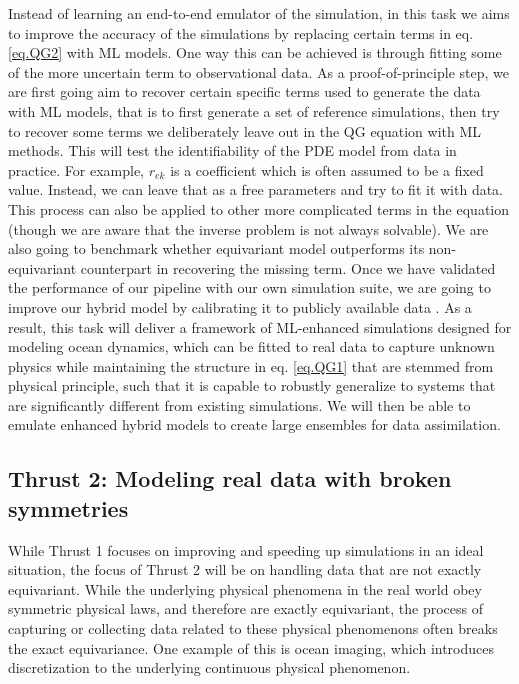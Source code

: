 \documentclass[11pt]{article}
\begin{document}
Instead of learning an end-to-end emulator of the simulation, in this task we aims to improve the accuracy of the simulations by replacing certain terms in eq. \ref{eq.QG2} with ML models. One way this can be achieved is through fitting some of the more uncertain term to observational data.
As a proof-of-principle step, we are first going aim to recover certain specific terms used to generate the data with ML models, that is to first generate a set of reference simulations, then try to recover some terms we deliberately leave out in the QG equation with ML methods. This will test the identifiability of the PDE model from data in practice. For example, $r_{ek}$ is a coefficient which is often assumed to be a fixed value. Instead, we can leave that as a free parameters and try to fit it with data. This process can also be applied to other more complicated terms in the equation (though we are aware that the inverse problem is not always solvable). We are also going to benchmark whether equivariant model outperforms its non-equivariant counterpart in recovering the missing term. Once we have validated the performance of our pipeline with our own simulation suite, we are going to improve our hybrid model by calibrating it to publicly available data \cite{2004AGUFMSF31A0712O}. 
As a result, this task will deliver a framework of ML-enhanced simulations designed for modeling ocean dynamics, which can be fitted to real data to capture unknown physics while maintaining the structure in eq. \ref{eq.QG1} that are stemmed from physical principle, such that it is capable to robustly generalize to systems that are significantly different from existing simulations. We will then be able to emulate enhanced hybrid models to create large ensembles for data assimilation.

\subsection{Thrust 2: Modeling real data with broken symmetries}

While Thrust 1 focuses on improving and speeding up simulations in an ideal situation, the focus of Thrust 2 will be on handling data that are not exactly equivariant. While the underlying physical phenomena in the real world obey symmetric physical laws, and therefore are exactly equivariant, the process of capturing or collecting data related to these physical phenomenons often breaks the exact equivariance. One example of this is ocean imaging, which introduces discretization to the underlying continuous physical phenomenon. 
\end{document}
